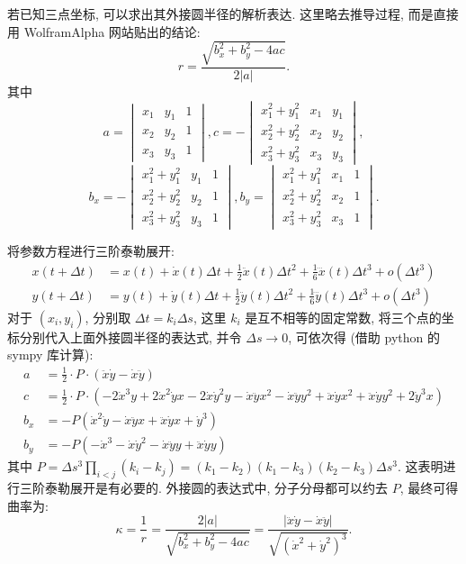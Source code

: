 若已知三点坐标, 可以求出其外接圆半径的解析表达. 这里略去推导过程, 而是直接用 WolframAlpha 网站贴出的结论:
\[r = \frac{\sqrt{b_x^2+b_y^2-4ac}}{2|a|} .\]
其中
\[
a = \begin{vmatrix}
x_1 & y_1 & 1 \\ 
x_2 & y_2 & 1 \\ 
x_3 & y_3 & 1
\end{vmatrix},  c = -\begin{vmatrix}
x_1^2 + y_1^2& x_1 & y_1 \\ 
x_2^2 + y_2^2& x_2 & y_2 \\ 
x_3^2 + y_3^2& x_3 & y_3
\end{vmatrix}, \]\[
b_x = -\begin{vmatrix}
x_1^2 + y_1^2& y_1 & 1 \\ 
x_2^2 + y_2^2& y_2 & 1 \\ 
x_3^2 + y_3^2& y_3 & 1
\end{vmatrix}, b_y = \begin{vmatrix}
x_1^2 + y_1^2& x_1 & 1 \\ 
x_2^2 + y_2^2& x_2 & 1 \\ 
x_3^2 + y_3^2& x_3 & 1
\end{vmatrix}.
\]

将参数方程进行三阶泰勒展开:
\begin{align*}
x(t+\Delta t) &= x(t) + \dot{x}(t)\Delta t + \frac{1}{2}\ddot{x}(t)\Delta t^2 + \frac{1}{6}\dddot{x}(t)\Delta t^3 + o(\Delta t^3) \\
y(t+\Delta t) &= y(t) + \dot{y}(t)\Delta t + \frac{1}{2}\ddot{y}(t)\Delta t^2 + \frac{1}{6}\dddot{y}(t)\Delta t^3 + o(\Delta t^3)
\end{align*}
对于 $(x_i, y_i)$, 分别取 $\Delta t = k_i\Delta s$, 这里 $k_i$ 是互不相等的固定常数, 将三个点的坐标分别代入上面外接圆半径的表达式, 并令 $\Delta s\to 0$, 可依次得 (借助 python 的 sympy 库计算):
\begin{align*}
a &= \frac{1}{2}\cdot P\cdot(\ddot{x}\dot{y}-\dot{x}\ddot{y}) \\
c &= \frac{1}{2}\cdot P\cdot(-2\dot{x}^3y + 2\dot{x}^2\dot{y}x - 2\dot{x}\dot{y}^2y - \dot{x}\ddot{y}x^2 - \dot{x}\ddot{y}y^2 + \ddot{x}\dot{y}x^2 + \ddot{x}\dot{y}y^2 + 2\dot{y}^3x)\\
b_x &= -P(\dot{x}^2\dot{y} - \dot{x}\ddot{y}x + \ddot{x}\dot{y}x + \dot{y}^3)\\
b_y &= -P(-\dot{x}^3 - \dot{x}\dot{y}^2 - \dot{x}\ddot{y}y + \ddot{x}\dot{y}y)
\end{align*}
其中 $\displaystyle P = \Delta s^3\prod_{i<j}(k_i - k_j) = (k_1-k_2)(k_1-k_3)(k_2-k_3)\Delta s^3$. 这表明进行三阶泰勒展开是有必要的. 外接圆的表达式中, 分子分母都可以约去 $P$, 最终可得曲率为:
\[ \kappa = \frac{1}{r} = \frac{2|a|}{\sqrt{b_x^2+b_y^2-4ac}} = \frac{|\ddot{x}\dot{y}-\dot{x}\ddot{y}|}{\sqrt{(\dot{x}^2+\dot{y}^2)^{3}}} .\]

